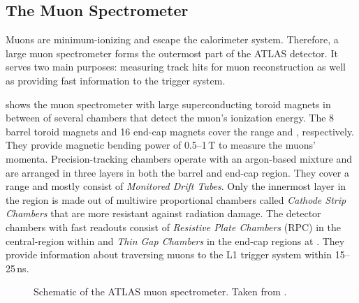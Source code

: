 \subsection{The Muon Spectrometer}
Muons are minimum-ionizing and escape the calorimeter system. Therefore, a large muon spectrometer forms the outermost part of the ATLAS detector. It serves two main purposes: measuring track hits for muon reconstruction as well as providing fast information to the trigger system.

 shows the muon spectrometer with large superconducting toroid magnets in between of several chambers that detect the muon's ionization energy.
The 8 barrel toroid magnets and 16 end-cap magnets cover the range  and , respectively. They provide magnetic bending power of \numrange{0.5}{1}\,T to measure the muons' momenta. Precision-tracking chambers operate with an argon-based mixture and are arranged in three layers in both the barrel and end-cap region. They cover a range  and mostly consist of \emph{Monitored Drift Tubes}. Only the innermost layer in the region  is made out of multiwire proportional chambers called \emph{Cathode Strip Chambers} that are more resistant against radiation damage. The detector chambers with fast readouts consist of \emph{Resistive Plate Chambers} (RPC) in the central-region within  and \emph{Thin Gap Chambers} in the end-cap regions at . They provide information about traversing muons to the L1 trigger system within \numrange{15}{25}\,ns.



\begin{figure}
    \caption{Schematic of the ATLAS muon spectrometer. Taken from .}
    \label{fig:ATLASmuonspectrometer}
\end{figure}




